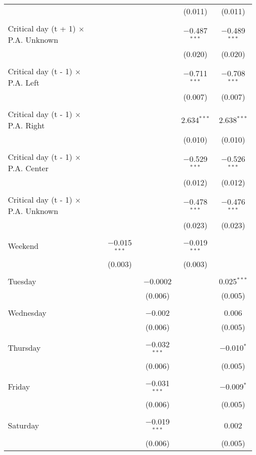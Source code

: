 \documentclass[
]{article}
\begin{document}
\begin{table}[!htbp]
{\begin{tabular}{@{\extracolsep{5pt}}lcccc}
  &  &  & (0.011) & (0.011) \\ 
  & & & & \\ 
 Critical day (t + 1) $\times$ P.A. Unknown &  &  & $-$0.487$^{***}$ & $-$0.489$^{***}$ \\ 
  &  &  & (0.020) & (0.020) \\ 
  & & & & \\ 
 Critical day (t - 1) $\times$ P.A. Left &  &  & $-$0.711$^{***}$ & $-$0.708$^{***}$ \\ 
  &  &  & (0.007) & (0.007) \\ 
  & & & & \\ 
 Critical day (t - 1) $\times$ P.A. Right &  &  & 2.634$^{***}$ & 2.638$^{***}$ \\ 
  &  &  & (0.010) & (0.010) \\ 
  & & & & \\ 
 Critical day (t - 1) $\times$ P.A. Center &  &  & $-$0.529$^{***}$ & $-$0.526$^{***}$ \\ 
  &  &  & (0.012) & (0.012) \\ 
  & & & & \\ 
 Critical day (t - 1) $\times$ P.A. Unknown &  &  & $-$0.478$^{***}$ & $-$0.476$^{***}$ \\ 
  &  &  & (0.023) & (0.023) \\ 
  & & & & \\ 
 Weekend & $-$0.015$^{***}$ &  & $-$0.019$^{***}$ &  \\ 
  & (0.003) &  & (0.003) &  \\ 
  & & & & \\ 
 Tuesday &  & $-$0.0002 &  & 0.025$^{***}$ \\ 
  &  & (0.006) &  & (0.005) \\ 
  & & & & \\ 
 Wednesday &  & $-$0.002 &  & 0.006 \\ 
  &  & (0.006) &  & (0.005) \\ 
  & & & & \\ 
 Thursday &  & $-$0.032$^{***}$ &  & $-$0.010$^{*}$ \\ 
  &  & (0.006) &  & (0.005) \\ 
  & & & & \\ 
 Friday &  & $-$0.031$^{***}$ &  & $-$0.009$^{*}$ \\ 
  &  & (0.006) &  & (0.005) \\ 
  & & & & \\ 
 Saturday &  & $-$0.019$^{***}$ &  & 0.002 \\ 
  &  & (0.006) &  & (0.005) \\ 

\end{tabular}}
\end{table}
\end{document}
